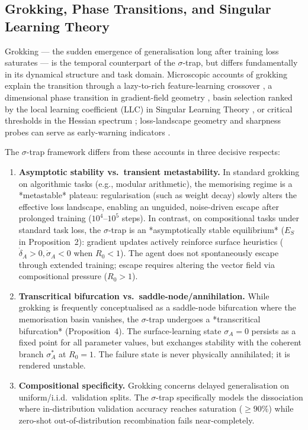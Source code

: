 \documentclass{article}
\theoremstyle{definition}
\begin{document}
\subsection{Grokking, Phase Transitions, and Singular Learning Theory}\label{sec:grokking}

Grokking --- the sudden emergence of generalisation long after training loss saturates \citep{power2022grokking,liu2022grokking} --- is the temporal counterpart of the $\sigma$-trap, but differs fundamentally in its dynamical structure and task domain. Microscopic accounts of grokking explain the transition through a lazy-to-rich feature-learning crossover \citep{kumar2023grokkingeffectivetheory}, a dimensional phase transition in gradient-field geometry \citep{wang2026grokkingdimensionalphase}, basin selection ranked by the local learning coefficient (LLC) in Singular Learning Theory \citep{cullen2026basinselectiongrokking}, or critical thresholds in the Hessian spectrum \citep{montanari2026}; loss-landscape geometry and sharpness probes can serve as early-warning indicators \citep{xu2026earlywarning,foret2021sharpnessawareminimization}.

The $\sigma$-trap framework differs from these accounts in three decisive respects:
\begin{enumerate}[nosep]
\item \textbf{Asymptotic stability vs.\ transient metastability.} In standard grokking on algorithmic tasks (e.g., modular arithmetic), the memorising regime is a *metastable* plateau: regularisation (such as weight decay) slowly alters the effective loss landscape, enabling an unguided, noise-driven escape after prolonged training ($10^4$--$10^5$ steps). In contrast, on compositional tasks under standard task loss, the $\sigma$-trap is an *asymptotically stable equilibrium* ($E_S$ in Proposition~2): gradient updates actively reinforce surface heuristics ($\dot{\delta}_A > 0, \dot{\sigma}_A < 0$ when $R_0 < 1$). The agent does not spontaneously escape through extended training; escape requires altering the vector field via compositional pressure ($R_0 > 1$).
\item \textbf{Transcritical bifurcation vs.\ saddle-node/annihilation.} While grokking is frequently conceptualised as a saddle-node bifurcation where the memorisation basin vanishes, the $\sigma$-trap undergoes a *transcritical bifurcation* (Proposition~4). The surface-learning state $\sigma_A = 0$ persists as a fixed point for all parameter values, but exchanges stability with the coherent branch $\sigma_A^*$ at $R_0 = 1$. The failure state is never physically annihilated; it is rendered unstable.
\item \textbf{Compositional specificity.} Grokking concerns delayed generalisation on uniform/i.i.d.\ validation splits. The $\sigma$-trap specifically models the dissociation where in-distribution validation accuracy reaches saturation ($\ge 90\%$) while zero-shot out-of-distribution recombination fails near-completely.
\end{enumerate}
\end{document}
